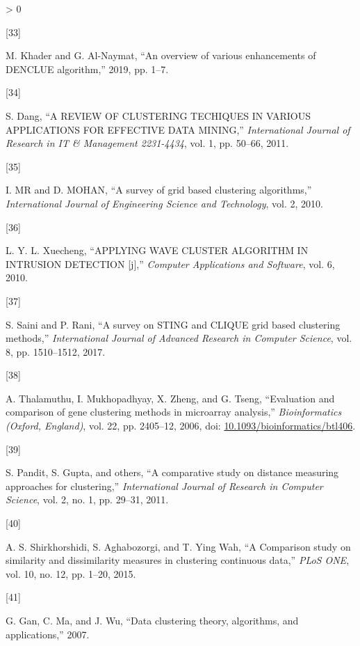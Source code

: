 \documentclass[
]{article}
\newlength{\cslhangindent}
\newlength{\csllabelwidth}
\newenvironment{CSLReferences}[3] %
 {%
  \setlength{\parindent}{0pt}
  \ifodd #1 \everypar{\setlength{\hangindent}{\cslhangindent}}\ignorespaces\fi
  \ifnum #2 > 0
  \setlength{\parskip}{#2\baselineskip}
  \fi
 }%
 {}
\newcommand{\CSLLeftMargin}[1]{\parbox[t]{\csllabelwidth}{#1}}
\newcommand{\CSLRightInline}[1]{\parbox[t]{\linewidth - \csllabelwidth}{#1}}
\begin{document}
\begin{CSLReferences}{0}{0}
\leavevmode\hypertarget{ref-Rmariamghazi2019}{}%
\CSLLeftMargin{{[}33{]} }
\CSLRightInline{M. Khader and G. Al-Naymat, {``An overview of various
enhancements of DENCLUE algorithm,''} 2019, pp. 1--7.}

\leavevmode\hypertarget{ref-Rshilpa2011}{}%
\CSLLeftMargin{{[}34{]} }
\CSLRightInline{S. Dang, {``A REVIEW OF CLUSTERING TECHIQUES IN VARIOUS
APPLICATIONS FOR EFFECTIVE DATA MINING,''} \emph{International Journal
of Research in IT \& Management 2231-4434}, vol. 1, pp. 50--66, 2011.}

\leavevmode\hypertarget{ref-Rilangodr2010}{}%
\CSLLeftMargin{{[}35{]} }
\CSLRightInline{I. MR and D. MOHAN, {``A survey of grid based clustering
algorithms,''} \emph{International Journal of Engineering Science and
Technology}, vol. 2, 2010.}

\leavevmode\hypertarget{ref-Rliliu2010}{}%
\CSLLeftMargin{{[}36{]} }
\CSLRightInline{L. Y. L. Xuecheng, {``APPLYING WAVE CLUSTER ALGORITHM IN
INTRUSION DETECTION {[}j{]},''} \emph{Computer Applications and
Software}, vol. 6, 2010.}

\leavevmode\hypertarget{ref-Rsainirani2017}{}%
\CSLLeftMargin{{[}37{]} }
\CSLRightInline{S. Saini and P. Rani, {``A survey on STING and CLIQUE
grid based clustering methods,''} \emph{International Journal of
Advanced Research in Computer Science}, vol. 8, pp. 1510--1512, 2017.}

\leavevmode\hypertarget{ref-Ranbupalamindranilxiaojinggeorge2006}{}%
\CSLLeftMargin{{[}38{]} }
\CSLRightInline{A. Thalamuthu, I. Mukhopadhyay, X. Zheng, and G. Tseng,
{``Evaluation and comparison of gene clustering methods in microarray
analysis,''} \emph{Bioinformatics (Oxford, England)}, vol. 22, pp.
2405--12, 2006, doi:
\href{https://doi.org/10.1093/bioinformatics/btl406}{10.1093/bioinformatics/btl406}.}

\leavevmode\hypertarget{ref-Rshraddhasuchitaothers2011}{}%
\CSLLeftMargin{{[}39{]} }
\CSLRightInline{S. Pandit, S. Gupta, and others, {``A comparative study
on distance measuring approaches for clustering,''} \emph{International
Journal of Research in Computer Science}, vol. 2, no. 1, pp. 29--31,
2011.}

\leavevmode\hypertarget{ref-Raliseyedsaeedteh2015}{}%
\CSLLeftMargin{{[}40{]} }
\CSLRightInline{A. S. Shirkhorshidi, S. Aghabozorgi, and T. Ying Wah,
{``{A Comparison study on similarity and dissimilarity measures in
clustering continuous data},''} \emph{PLoS ONE}, vol. 10, no. 12, pp.
1--20, 2015.}

\leavevmode\hypertarget{ref-Rganmawu2007}{}%
\CSLLeftMargin{{[}41{]} }
\CSLRightInline{G. Gan, C. Ma, and J. Wu, {``Data clustering {} theory,
algorithms, and applications,''} 2007.}


\end{CSLReferences}
\end{document}
